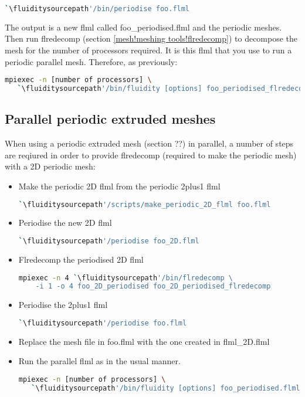 \begin{lstlisting}[language=bash]
`\fluiditysourcepath'/bin/periodise foo.flml
\end{lstlisting}

The output is a new flml called  foo\_periodised.flml and the periodic meshes. Then run flredecomp (section \ref{mesh!meshing tools!flredecomp}) to decompose the mesh for the number of processors required. It is this flml that you use to run a periodic parallel mesh. Therefore, as previously:

\begin{lstlisting}[language=bash]
mpiexec -n [number of processors] \
   `\fluiditysourcepath'/bin/fluidity [options] foo_periodised_flredecomp.flml
\end{lstlisting}

\subsection{Parallel periodic extruded meshes}
When using a periodic extruded mesh (section ??) in parallel, a number
of steps are reqiured in order to provide flredecomp (required to make the
periodic mesh) with a 2D periodic mesh:

\begin{itemize}
\item Make the periodic 2D flml from the periodic 2plus1 flml
\begin{lstlisting}[language=bash]
 `\fluiditysourcepath'/scripts/make_periodic_2D_flml foo.flml
\end{lstlisting}
\item Periodise the new 2D flml
\begin{lstlisting}[language=bash]
 `\fluiditysourcepath'/periodise foo_2D.flml
\end{lstlisting}
\item Flredecomp the periodised 2D flml
\begin{lstlisting}[language=bash]
mpiexec -n 4 `\fluiditysourcepath'/bin/flredecomp \
    -i 1 -o 4 foo_2D_periodised foo_2D_periodised_flredecomp
\end{lstlisting}
\item Periodise the 2plus1 flml
\begin{lstlisting}[language=bash]
 `\fluiditysourcepath'/periodise foo.flml
\end{lstlisting}
\item Replace the mesh file in foo.flml with the one created in flml\_2D.flml
\item Run the parallel flml as in the usual manner.
\begin{lstlisting}[language=bash]
mpiexec -n [number of processors] \
   `\fluiditysourcepath'/bin/fluidity [options] foo_periodised.flml
\end{lstlisting}
\end{itemize}


